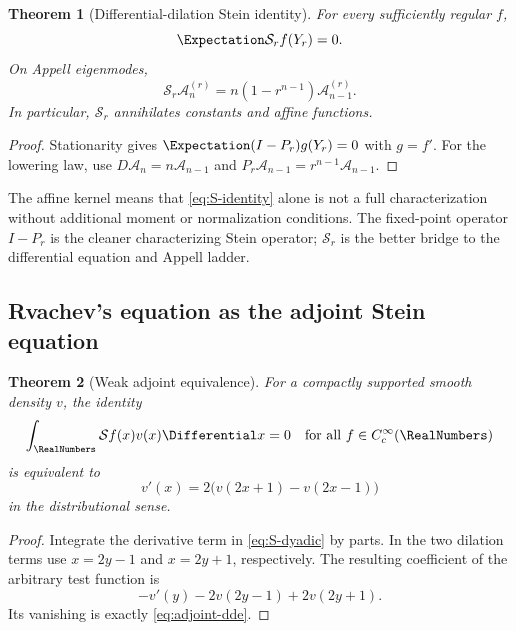 \documentclass[11pt,a4paper]{article}
\newtheorem{theorem}{Theorem}[section]
\theoremstyle{definition}
\theoremstyle{remark}
\newcommand{\Acal}{\mathcal A}
\newcommand{\Scal}{\mathcal S}
\begin{document}
\begin{theorem}[Differential-dilation Stein identity]
\label{thm:differential-Stein}
For every sufficiently regular $f$,
\begin{equation}
 \Expectation\Scal_rf(Y_r)=0.
 \label{eq:S-identity}
\end{equation}
On Appell eigenmodes,
\begin{equation}
 \boxed{\displaystyle
 \Scal_r\Acal_n^{(r)}
 =n(1-r^{n-1})\Acal_{n-1}^{(r)}.}
 \label{eq:S-lowering}
\end{equation}
In particular, $\Scal_r$ annihilates constants and affine functions.
\end{theorem}

\begin{proof}
Stationarity gives $\Expectation(I-P_r)g(Y_r)=0$ with $g=f'$. For the lowering law, use $D\Acal_n=n\Acal_{n-1}$ and $P_r\Acal_{n-1}=r^{n-1}\Acal_{n-1}$.
\end{proof}

The affine kernel means that \eqref{eq:S-identity} alone is not a full characterization without additional moment or normalization conditions. The fixed-point operator $I-P_r$ is the cleaner characterizing Stein operator; $\Scal_r$ is the better bridge to the differential equation and Appell ladder.

\subsection{Rvachev's equation as the adjoint Stein equation}

\begin{theorem}[Weak adjoint equivalence]
\label{thm:adjoint-DDE}
For a compactly supported smooth density $v$, the identity
\begin{equation}
 \int_{\RealNumbers}\Scal f(x)v(x)\Differential x=0
 \quad\text{for all }f\in C_c^\infty(\RealNumbers)
 \label{eq:weak-Stein}
\end{equation}
is equivalent to
\begin{equation}
 v'(x)=2\bigl(v(2x+1)-v(2x-1)\bigr)
 \label{eq:adjoint-dde}
\end{equation}
in the distributional sense.
\end{theorem}

\begin{proof}
Integrate the derivative term in \eqref{eq:S-dyadic} by parts. In the two dilation terms use $x=2y-1$ and $x=2y+1$, respectively. The resulting coefficient of the arbitrary test function is
\[
 -v'(y)-2v(2y-1)+2v(2y+1).
\]
Its vanishing is exactly \eqref{eq:adjoint-dde}.
\end{proof}
\end{document}
